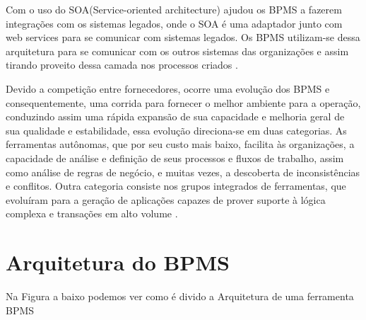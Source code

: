 Com o uso do SOA(Service-oriented architecture) ajudou os BPMS a fazerem integrações com os sistemas legados, onde o SOA é uma adaptador junto com web services para se comunicar com sistemas legados. Os BPMS utilizam-se dessa arquitetura para se comunicar com os outros sistemas das organizações e assim tirando proveito dessa camada nos processos criados \cite{CBOK}.

Devido a competição entre fornecedores, ocorre uma evolução dos BPMS e consequentemente, uma corrida para fornecer o melhor ambiente para a operação, conduzindo assim uma rápida expansão de sua capacidade e melhoria geral de sua qualidade e estabilidade, essa evolução direciona-se em duas categorias. As ferramentas autônomas, que por seu custo mais baixo, facilita às organizações, a capacidade de análise e definição de seus processos e fluxos de trabalho, assim como análise de regras de negócio, e muitas vezes, a descoberta de inconsistências e conflitos. Outra categoria consiste nos grupos integrados de ferramentas, que evoluíram para a geração de aplicações capazes de prover suporte à lógica complexa e transações em alto volume \cite{CBOK}.


\section{Arquitetura do BPMS}
\label{sec:Arquitetura do BPMS}
	Na Figura a baixo podemos ver como é divido a Arquitetura de uma ferramenta BPMS
    
\begin{figure}[h!]
	\centering
       	{
		}	
	\end{figure}
    
